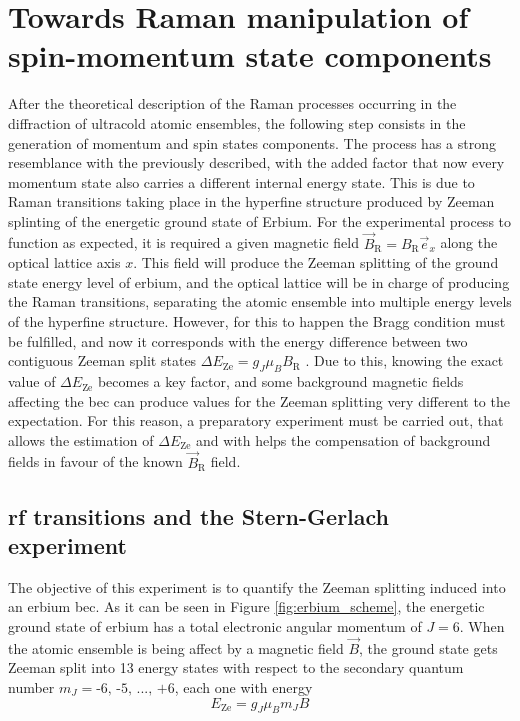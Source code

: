
\chapter{Towards Raman manipulation of spin-momentum state components}
\label{chap:raman_manipulation}

After the theoretical description of the Raman processes occurring in the diffraction of ultracold atomic ensembles, the following step consists in the generation of momentum and spin states components. The process has a strong resemblance with the previously described, with the added factor that now every momentum state also carries a different internal energy state. This is due to Raman transitions taking place in the hyperfine structure produced by Zeeman splinting of the energetic ground state of Erbium. For the experimental process to function as expected, it is required a given magnetic field $\vec{B}_\text{R} = B_{\text{R}} \vec{e}_x$ along the optical lattice axis $x$. This field will produce the Zeeman splitting of the ground state energy level of erbium, and the optical lattice will be in charge of producing the Raman transitions, separating the atomic ensemble into multiple energy levels of the hyperfine structure. However, for this to happen the Bragg condition must be fulfilled, and now it corresponds with the energy difference between two contiguous Zeeman split states $\Delta E_\text{Ze} = g_J \mu_B B_\text{R}$ \cite{Foot2005}. Due to this, knowing the exact value of $\Delta E_\text{Ze}$ becomes a key factor, and some background magnetic fields  affecting the \ac{bec} can produce values for the Zeeman splitting very different to the expectation. For this reason, a preparatory experiment must be carried out, that allows the estimation of $\Delta E_\text{Ze}$ and with helps the compensation of background fields in favour of the known $\vec{B}_\text{R}$ field.

\section{\Acl{rf} transitions and the Stern-Gerlach experiment}

The objective of this experiment is to quantify the Zeeman splitting induced into an erbium \ac{bec}. As it can be seen in Figure \ref{fig:erbium_scheme}, the energetic ground state of erbium has a total electronic angular momentum of $J = 6$. When the atomic ensemble is being affect by a magnetic field $\vec{B}$, the ground state gets Zeeman split into 13 energy states with respect to the secondary quantum number $m_J = \text{-6, -5, ..., +6}$, each one with energy \cite{Foot2005}
\begin{equation}
	E_\text{Ze} = g_J \mu_B m_J B
\end{equation}

